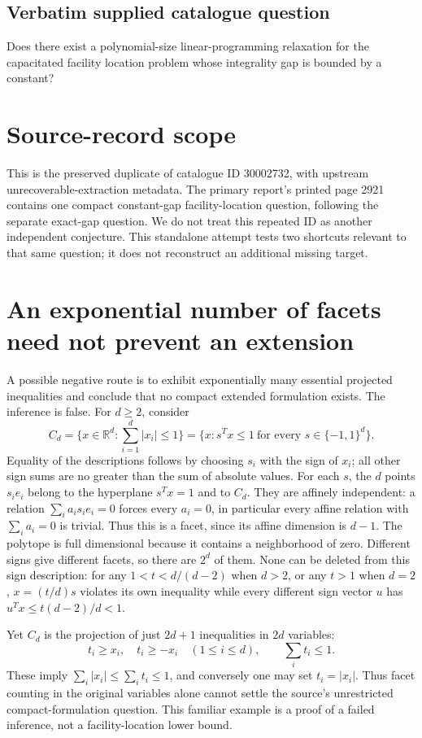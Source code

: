 \documentclass[11pt]{article}
\begin{document}
\subsection{Verbatim supplied catalogue question}
Does there exist a polynomial-size linear-programming relaxation for the capacitated facility location problem whose integrality gap is bounded by a constant?

\section{Source-record scope}
This is the preserved duplicate of catalogue ID 30002732, with upstream
unrecoverable-extraction metadata. The primary report's printed page 2921
contains one compact constant-gap facility-location question, following the
separate exact-gap question. We do not treat this repeated ID as another
independent conjecture. This standalone attempt tests two shortcuts relevant
to that same question; it does not reconstruct an additional missing target.

\section{An exponential number of facets need not prevent an extension}
A possible negative route is to exhibit exponentially many essential projected
inequalities and conclude that no compact extended formulation exists. The
inference is false. For $d\ge2$, consider
\[
C_d=\{x\in\mathbb R^d:\sum_{i=1}^d|x_i|\le1\}
 =\{x:s^Tx\le1\ \text{for every }s\in\{-1,1\}^d\}.
\]
Equality of the descriptions follows by choosing $s_i$ with the sign of $x_i$;
all other sign sums are no greater than the sum of absolute values.
For each $s$, the $d$ points $s_i e_i$ belong to the hyperplane $s^Tx=1$
and to $C_d$. They are affinely independent: a relation
$\sum_i a_i s_i e_i=0$ forces every $a_i=0$, in particular every affine
relation with $\sum_i a_i=0$ is trivial. Thus this is a facet, since its
affine dimension is $d-1$. The polytope is full dimensional because it
contains a neighborhood of zero. Different signs give different facets,
so there are $2^d$ of them. None can be deleted from this sign description:
for any $1<t<d/(d-2)$ when $d>2$, or any $t>1$ when $d=2$,
$x=(t/d)s$ violates its own inequality while every different sign vector
$u$ has $u^Tx\le t(d-2)/d<1$.

Yet $C_d$ is the projection of just $2d+1$ inequalities in $2d$ variables:
\[
t_i\ge x_i,\quad t_i\ge-x_i\quad(1\le i\le d),\qquad\sum_it_i\le1.
\]
These imply $\sum_i|x_i|\le\sum_it_i\le1$, and conversely one may set
$t_i=|x_i|$. Thus facet counting in the original variables alone cannot
settle the source's unrestricted compact-formulation question. This familiar
example is a proof of a failed inference, not a facility-location lower bound.
\end{document}
